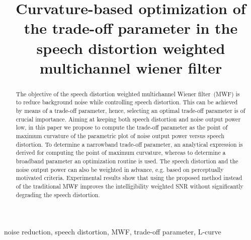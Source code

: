 \documentclass{article}
\title{Curvature-based optimization of the trade-off parameter in the speech distortion weighted multichannel wiener filter}
\def\ninept{\def\baselinestretch{.92}\let\normalsize\small\normalsize}
\begin{document}
\newlength\figureheight
\newlength\figurewidth
\setlength\figureheight{2.6cm}
\setlength{}
\ninept
%
\maketitle

\begin{abstract}
The objective of the speech distortion weighted multichannel Wiener filter~(MWF) is to reduce background noise while controlling speech distortion.
This can be achieved by means of a trade-off parameter, hence, selecting an optimal trade-off parameter is of crucial importance. \newline
Aiming at keeping both speech distortion and noise output power low, in this paper we propose to compute the trade-off parameter as the point of maximum curvature of the parametric plot of noise output power versus speech distortion.
To determine a narrowband trade-off parameter, an analytical expression is derived for computing the point of maximum curvature, whereas to determine a broadband parameter an optimization routine is used.
The speech distortion and the noise output power can also be weighted in advance, e.g. based on perceptually motivated criteria. 
Experimental results show that using the proposed method instead of the traditional MWF improves the intelligibility weighted SNR without significantly degrading the speech distortion.
\end{abstract}
%
\begin{keywords}
noise reduction, speech distortion, MWF, trade-off parameter, L-curve
\end{keywords}
%
\vspace{-0.25cm}
\end{document}
